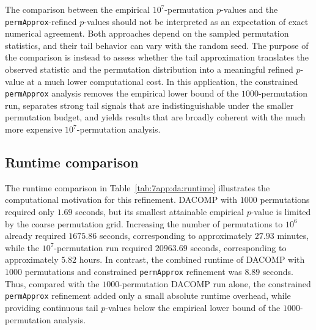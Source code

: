 The comparison between the empirical $10^7$-permutation $p$-values and the \texttt{permApprox}-refined $p$-values should not be interpreted as an expectation of exact numerical agreement. Both approaches depend on the sampled permutation statistics, and their tail behavior can vary with the random seed. The purpose of the comparison is instead to assess whether the tail approximation translates the observed statistic and the  permutation distribution into a meaningful refined $p$-value at a much lower computational cost. In this application, the constrained \texttt{permApprox} analysis removes the empirical lower bound of the $1000$-permutation run, separates strong tail signals that are indistinguishable under the smaller permutation budget, and yields results that are broadly coherent with the much more expensive $10^7$-permutation analysis.

\subsection{Runtime comparison}
\label{sec:7app:differential-abundance:runtime}

The runtime comparison in Table~\ref{tab:7app:da:runtime} illustrates the computational motivation for this refinement. DACOMP with $1000$ permutations required only $1.69$ seconds, but its smallest attainable empirical $p$-value is limited by the coarse permutation grid. Increasing the number of permutations to $10^6$ already required $1675.86$ seconds, corresponding to approximately $27.93$ minutes, while the $10^7$-permutation run required $20963.69$ seconds, corresponding to approximately $5.82$ hours. In contrast, the combined runtime of DACOMP with $1000$ permutations and constrained \texttt{permApprox} refinement was $8.89$ seconds. Thus, compared with the $1000$-permutation DACOMP run alone, the constrained \texttt{permApprox} refinement added only a small absolute runtime overhead, while providing continuous tail $p$-values below the empirical lower bound of the $1000$-permutation analysis.

